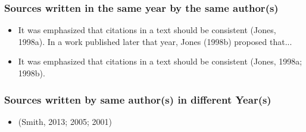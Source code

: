 \subsubsection {Sources written in the same year by the same author(s)}
\begin{itemize}
	\item It was emphasized that citations in a text should be consistent (Jones, 1998a). In a work published later that year, Jones (1998b) proposed that...
	\item It was emphasized that citations in a text should be consistent (Jones, 1998a; 1998b).
\end{itemize}

\subsubsection {Sources written by same author(s) in different Year(s)}
\begin{itemize}
	\item (Smith, 2013; 2005; 2001)
\end{itemize}



